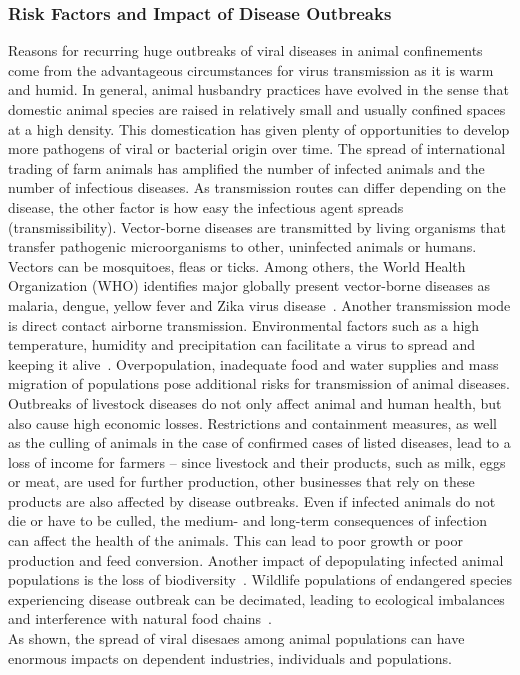 \subsubsection*{Risk Factors and Impact of Disease Outbreaks}
Reasons for recurring huge outbreaks of viral diseases in animal confinements come from the advantageous circumstances for virus transmission as it is warm and humid. In general, animal husbandry practices have evolved in the sense that domestic animal species are raised in relatively small and usually confined spaces at a high density. This domestication has given plenty of opportunities to develop more pathogens of viral or bacterial origin over time. The spread of international trading of farm animals has amplified the number of infected animals and the number of infectious diseases. As transmission routes can differ depending on the disease, the other factor is how easy the infectious agent spreads (transmissibility). Vector-borne diseases are transmitted by living organisms that transfer pathogenic microorganisms to other, uninfected animals or humans. Vectors can be mosquitoes, fleas or ticks. Among others, the World Health Organization (WHO) identifies major globally present vector-borne diseases as malaria, dengue, yellow fever and Zika virus disease~\cite{world2017global}. Another transmission mode is direct contact airborne transmission. Environmental factors such as a high temperature, humidity and precipitation can facilitate a virus to spread and keeping it alive~\cite{eccles2002explanation}. Overpopulation, inadequate food and water supplies and mass migration of populations pose additional risks for transmission of animal diseases. \\
Outbreaks of livestock diseases do not only affect animal and human health, but also cause high economic losses. Restrictions and containment measures, as well as the culling of animals in the case of confirmed cases of listed diseases, lead to a loss of income for farmers -- since livestock and their products, such as milk, eggs or meat, are used for further production, other businesses that rely on these products are also affected by disease outbreaks. Even if infected animals do not die or have to be culled, the medium- and long-term consequences of infection can affect the health of the animals. This can lead to poor growth or poor production and feed conversion. Another impact of depopulating infected animal populations is the loss of biodiversity~\cite{lacroix2014non, morand2020emerging}. Wildlife populations of endangered species experiencing disease outbreak can be decimated, leading to ecological imbalances and interference with natural food chains~\cite{reid2010global, civitello2015biodiversity, espinosa2020infectious}. \\
As shown, the spread of viral disesaes among animal populations can have enormous impacts on dependent industries, individuals and populations.

